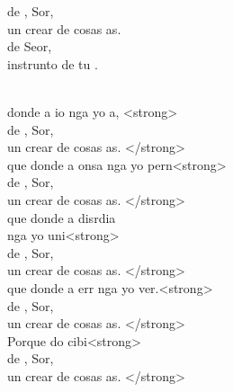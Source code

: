 \documentclass[12pt]{article}
\begin{document}
\begin{multicols*}{2}
\begin{cancion}%
	\begin{chorus}%
	 de , Sor,  \\
	un crear de cosas as. \\
	 de  Seor,\\
	instrunto de tu .  \\
	\end{chorus}%
	\jump\\
	 donde a io nga yo a, <strong>\\
	 de , Sor,  \\
	un crear de cosas as. </strong>\\
	que donde a onsa nga yo pern<strong>\\
	 de , Sor,  \\
	un crear de cosas as. </strong>\\
	que donde a disrdia \\
	nga yo uni<strong>\\
	 de , Sor,  \\
	un crear de cosas as. </strong>\\
	que donde a err nga yo ver.<strong>\\
	 de , Sor,  \\
	un crear de cosas as. </strong>\\
\jump
	Porque do  cibi<strong>\\
	 de , Sor,  \\
	un crear de cosas as. </strong>\\

\end{cancion}
\end{multicols*}
\end{document}
